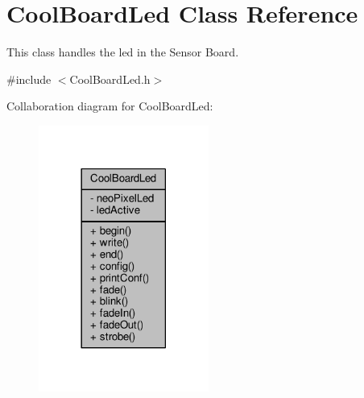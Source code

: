 \hypertarget{classCoolBoardLed}{}\section{Cool\+Board\+Led Class Reference}
\label{classCoolBoardLed}


This class handles the led in the Sensor Board.  




{\ttfamily \#include $<$Cool\+Board\+Led.\+h$>$}



Collaboration diagram for Cool\+Board\+Led\+:
\nopagebreak
\begin{figure}[H]
\begin{center}
\leavevmode
\includegraphics[width=158pt]{classCoolBoardLed__coll__graph}
\end{center}
\end{figure}
